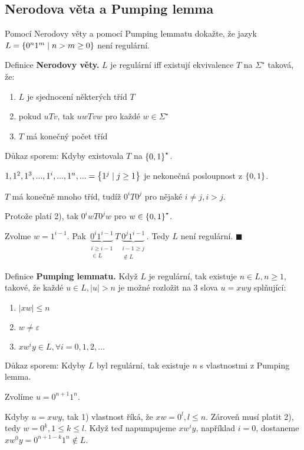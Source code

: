 \subsection{Nerodova věta a Pumping lemma}
Pomocí Nerodovy věty a pomocí Pumping lemmatu dokažte, že jazyk $L = \left\lbrace 0^n 1^m \mid n > m \geq 0 \right\rbrace$ není regulární.

Definice \textbf{Nerodovy věty.} $L$ je regulární iff existují ekvivalence $T$ na $\Sigma^\star$ taková, že:
\begin{enumerate}[1), noitemsep]
    \item $L$ je sjednocení některých tříd $T$
    \item pokud $uTv$, tak $uwTvw$ pro každé $w \in \Sigma^\star$
    \item $T$ má konečný počet tříd
\end{enumerate}
Důkaz sporem:
Kdyby existovala $T$ na $\left\lbrace 0,1 \right\rbrace^\star$.

$1, 1^2, 1^3, ..., 1^i, ..., 1^n, ... = \left\lbrace 1^j \mid j \geq 1 \right\rbrace$ je nekonečná posloupnost z $\left\lbrace 0,1 \right\rbrace$.

$T$ má konečně mnoho tříd, tudíž $0^i T 0^j$ pro nějaké $i \not= j, i>j$.

Protože platí 2), tak $0^i w T 0^j w$ pro $w \in \left\lbrace 0,1 \right\rbrace^\star$.

Zvolme $w = 1^{i-1}$. Pak $\underbrace{0^i 1^{i-1}}_{\substack{i \geq i-1 \\ \in L}} T
\underbrace{0^j 1^{i-1}}_{\substack{i-1 \geq j  \\\not\in L }}$. Tedy $L$ není regulární. $\blacksquare$

Definice \textbf{Pumping lemmatu.} Když $L$ je regulární, tak existuje $n \in L, n \geq 1$, takové, že každé ${u \in L},
|u| > n$ je
možné rozložit na 3 slova $u = xwy$ splňující:
\begin{enumerate}[1), noitemsep]
    \item $|xw| \leq n$
    \item $w \not= \varepsilon$
    \item $xw^i y \in L, \forall i = 0, 1, 2, ...$
\end{enumerate}
Důkaz sporem:
Kdyby $L$ byl regulární, tak existuje $n$ s vlastnostmi z Pumping lemma.

Zvolíme $u = 0^{n+1} 1^n$.

Kdyby $u = xwy$, tak 1) vlastnost říká, že $xw = 0^l, l \leq n$. Zároveň musí platit 2), tedy $w = 0^k, 1 \leq k \leq l$.
Když teď napumpujeme $xw^i y$, například $i=0$, dostaneme $xw^0 y = 0^{n+1-k} 1^{n} \not\in L$.

